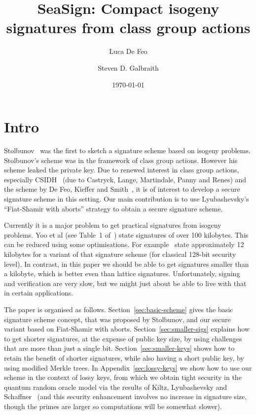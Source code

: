 \documentclass{llncs}
\title{SeaSign: Compact isogeny signatures from class group actions}
\author{Luca De Feo \and Steven D. Galbraith}
\institute{Mathematics Department, University of Auckland, NZ.
\email{s.galbraith@auckland.ac.nz}}
\date{\today}
\begin{document}
\pagestyle{plain}

\maketitle


\begin{abstract}

\end{abstract}



\section{Intro}

Stolbunov~\cite{Sto12} was the first to sketch a signature scheme based on isogeny problems.
Stolbunov's scheme was in the framework of class group actions.
However his scheme leaked the private key.
Due to renewed interest in class group actions, especially CSIDH~\cite{CLMPR18} (due to Castryck, Lange, Martindale, Panny and Renes) and the scheme by De Feo, Kieffer and Smith~\cite{DFKS18}, it is of interest to develop a secure signature scheme in this setting.
Our main contribution is to use Lyubashevsky's ``Fiat-Shamir with aborts'' strategy to obtain a secure signature scheme.




Currently it is a major problem to get practical signatures from isogeny problems.
Yoo et al (see Table~1 of~\cite{YAJJS17}) state signatures of over 100 kilobytes.
This can be reduced using some optimisations. For example~\cite{GPS17} state approximately 12 kilobytes for a variant of that signature scheme (for classical 128-bit security level).
In contrast, in this paper we should be able to get signatures smaller than a kilobyte, which is better even than lattice signatures.
Unfortunately, signing and verification are very slow, but we might just about be able to live with that in certain applications.


The paper is organised as follows.
Section~\ref{sec:basic-scheme} gives the basic signature scheme concept, that was proposed by Stolbunov, and our secure variant based on Fiat-Shamir with aborts.
Section~\ref{sec:smaller-sigs} explains how to get shorter signatures, at the expense of public key size, by using challenges that are more than just a single bit.
Section~\ref{sec:smaller-keys} shows how to retain the benefit of shorter signatures, while also having a short public key, by using modified Merkle trees.
In Appendix~\ref{sec:lossy-keys} we show how to use our scheme in the context of lossy keys, from which we obtain tight security in the quantum random oracle model via the results of Kiltz, Lyubashevsky and Schaffner~\cite{KLS18} (and this security enhancement involves no increase in signature size, though the primes are larger so computations will be somewhat slower).
\end{document}

